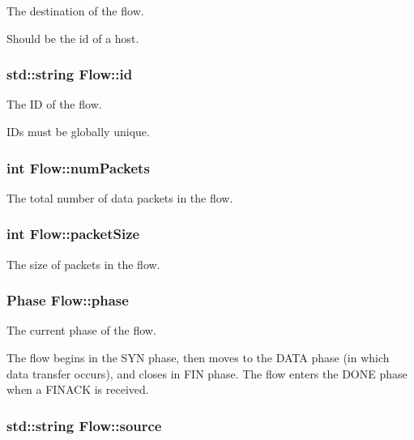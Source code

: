 \-The destination of the flow. 

\-Should be the id of a host. \hypertarget{classFlow_a8724a8f4ce94cf7bfb0db79e688ed179}{
\subsubsection[{id}]{\setlength{\rightskip}{0pt plus 5cm}std\-::string {\bf \-Flow\-::id}}}\label{classFlow_a8724a8f4ce94cf7bfb0db79e688ed179}


\-The \-I\-D of the flow. 

\-I\-Ds must be globally unique. \hypertarget{classFlow_a78d725176506b21ce2355b3742ab8c17}{
\subsubsection[{num\-Packets}]{\setlength{\rightskip}{0pt plus 5cm}int {\bf \-Flow\-::num\-Packets}}}\label{classFlow_a78d725176506b21ce2355b3742ab8c17}


\-The total number of data packets in the flow. 

\hypertarget{classFlow_ac5af37a8637ec606977ebc1e33a0c59b}{
\subsubsection[{packet\-Size}]{\setlength{\rightskip}{0pt plus 5cm}int {\bf \-Flow\-::packet\-Size}}}\label{classFlow_ac5af37a8637ec606977ebc1e33a0c59b}


\-The size of packets in the flow. 

\hypertarget{classFlow_a56615b49301aaddf4cab4fa3f878c5a7}{
\subsubsection[{phase}]{\setlength{\rightskip}{0pt plus 5cm}\-Phase {\bf \-Flow\-::phase}}}\label{classFlow_a56615b49301aaddf4cab4fa3f878c5a7}


\-The current phase of the flow. 

\-The flow begins in the \-S\-Y\-N phase, then moves to the \-D\-A\-T\-A phase (in which data transfer occurs), and closes in \-F\-I\-N phase. \-The flow enters the \-D\-O\-N\-E phase when a \-F\-I\-N\-A\-C\-K is received. \hypertarget{classFlow_a36eb3e23b0804647c30be41835b790b3}{
\subsubsection[{source}]{\setlength{\rightskip}{0pt plus 5cm}std\-::string {\bf \-Flow\-::source}}}\label{classFlow_a36eb3e23b0804647c30be41835b790b3}


